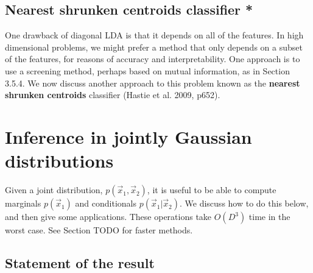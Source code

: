 \subsection{Nearest shrunken centroids classifier *}
One drawback of diagonal LDA is that it depends on all of the features. In high dimensional problems, we might prefer a method that only depends on a subset of the features, for reasons of accuracy and interpretability. One approach is to use a screening method, perhaps based on mutual information, as in Section 3.5.4. We now discuss another approach to this problem known as the \textbf{nearest shrunken centroids} classifier (Hastie et al. 2009, p652).


\section{Inference in jointly Gaussian distributions}
\label{sec:Inference-in-jointly-Gaussian-distributions}
Given a joint distribution, $p(\vec{x}_1,\vec{x}_2)$, it is useful to be able to compute marginals $p(\vec{x}_1)$ and conditionals $p(\vec{x}_1|\vec{x}_2)$. We discuss how to do this below, and then give some applications. These operations take $O(D^3)$ time in the worst case. See Section TODO for faster methods.


\subsection{Statement of the result}

